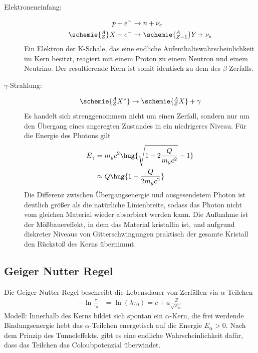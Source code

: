 \documentclass[twocolumn]{summery_4.1}
\begin{document}
\begin{description}
    \item[Elektroneneinfang:]
    \begin{align*}
        p+e^- &\to n + \nu_e\\
        \schemie{_Z^A} X + e^- &\to \schemie{_{Z-1}^A}Y + \nu_e
    \end{align*}
    Ein Elektron der K-Schale, das eine endliche Aufenthaltswahrscheinlichkeit im Kern besitzt, reagiert mit einem Proton zu einem Neutron und einem Neutrino. Der resultierende Kern ist somit identisch zu dem des \(\beta\)-Zerfalls.

    \item[\(\gamma\)-Strahlung:]
    \begin{align*}
        \schemie{_Z^A X^*} \to \schemie{_Z^A X} + \gamma 
    \end{align*}
    Es handelt sich strenggenommem nicht um einen Zerfall, sondern nur um den Übergang eines angeregten Zustandes in ein niedrigeres Niveau. Für die Energie des Photons gilt 
    \begin{align*}
        E_\gamma &= m_y c^2 \hug{\sqrt{1 + 2 \frac Q{m_y c^2}}-1}\\
        &\approx  Q \hug{1- \frac{Q}{2m_y c^2}}
    \end{align*}
    Die Differenz zwischen Übergangsenergie und ausgesendetem Photon ist deutlich größer als die natürliche Linienbreite, sodass das Photon nicht vom gleichen Material wieder absorbiert werden kann. Die Außnahme ist der Mößbauereffekt, in dem das Material kristallin ist, und aufgrund diskreter Niveaus von Gitterschwingungen praktisch der gesamte Kristall den Rückstoß des Kerns übernimmt.
\end{description}

\subsection{Geiger Nutter Regel}
Die Geiger Nutter Regel beschreibt die Lebensdauer von Zerfällen via \(\alpha\)-Teilchen
\begin{align*}
    -\ln \frac\tau{\tau_0} &= \ln (\lambda \tau_0) = c+ a \frac{Z}{\sqrt {E_\alpha}}
\end{align*}
Modell: Innerhalb des Kerns bildet sich spontan ein \(\alpha\)-Kern, die frei werdende Bindungsenergie hebt das \(\alpha\)-Teilchen energetisch auf die Energie \(E_\alpha>0\). Nach dem Prinzip des Tunneleffekts, gibt es eine endliche Wahrscheinlichkeit dafür, dass das Teilchen das Coloubpotenzial überwindet.
\end{document}
